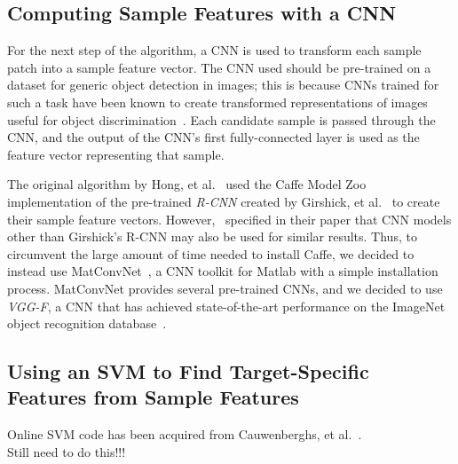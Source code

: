 \documentclass{sig-alternate-05-2015}
\newcommand{\todo}{{\\ \huge \color{red} Still need to do this!!!}} %
\begin{document}
\subsection{Computing Sample Features with a CNN}
For the next step of the algorithm, a CNN is used to transform each sample patch into a sample feature vector.
The CNN used should be pre-trained on a dataset for generic object detection in images; this is because CNNs trained for such a task have been known to create transformed representations of images useful for object discrimination~\cite{krizhevsky2012imagenet}.
Each candidate sample is passed through the CNN, and the output of the CNN's first fully-connected layer is used as the feature vector representing that sample.

The original algorithm by Hong, et al.~\cite{hong2015online} used the Caffe Model Zoo implementation of the pre-trained \textit{R-CNN} created by Girshick, et al.~\cite{girshick2016region} to create their sample feature vectors.
However,~\cite{hong2015online} specified in their paper that CNN models other than Girshick's R-CNN may also be used for similar results.
Thus, to circumvent the large amount of time needed to install Caffe, we decided to instead use MatConvNet~\cite{vedaldi2015matconvnet}, a CNN toolkit for Matlab with a simple installation process.
MatConvNet provides several pre-trained CNNs, and we decided to use \textit{VGG-F}, a CNN that has achieved state-of-the-art performance on the ImageNet object recognition database~\cite{chatfield2014return}.

\subsection{Using an SVM to Find Target-Specific Features from Sample Features}
Online SVM code has been acquired from Cauwenberghs, et al.~\cite{cauwenberghs2001incremental}. 
\todo
\end{document}
